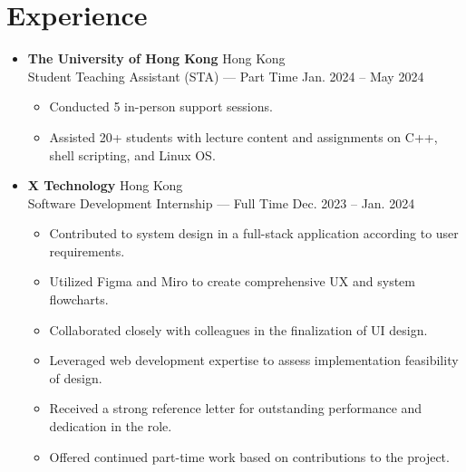 \documentclass{article}
\begin{document}
\section{Experience}
\begin{itemize}

    \item \textbf{The University of Hong Kong} \hfill Hong Kong \\
          Student Teaching Assistant (STA) --- Part Time \hfill Jan. 2024 {--} May 2024
          \begin{itemize}
              \item Conducted 5 in-person support sessions.
              \item Assisted 20+ students with lecture content and assignments on C++, shell scripting, and Linux OS\@.
          \end{itemize}
    \item \textbf{X Technology} \hfill Hong Kong \\
          Software Development Internship --- Full Time \hfill Dec. 2023 {--} Jan. 2024
          \begin{itemize}
              \item Contributed to system design in a full-stack application according to user requirements.
              \item Utilized Figma and Miro to create comprehensive UX and system flowcharts.
              \item Collaborated closely with colleagues in the finalization of UI design.
              \item Leveraged web development expertise to assess implementation feasibility of design.
              \item Received a strong reference letter for outstanding performance and dedication in the role.
              \item Offered continued part-time work based on contributions to the project.
          \end{itemize}

\end{itemize}\vspace{-16pt}
\end{document}
